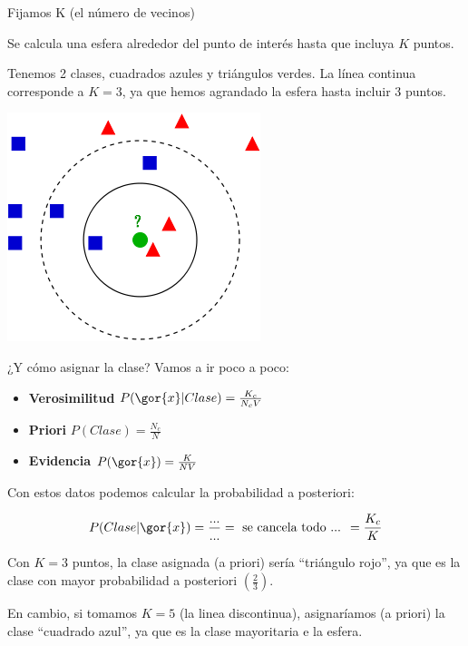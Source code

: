 \documentclass{apuntes}
\begin{document}
\begin{defn}
Fijamos K (el número de vecinos)

Se calcula una esfera alrededor del punto de interés hasta que incluya $K$ puntos.
\end{defn}

\begin{example}
Tenemos 2 clases, cuadrados azules y triángulos verdes. La línea continua corresponde a $K=3$, ya que hemos agrandado la esfera hasta incluir 3 puntos.

\begin{center}
\includegraphics[scale=0.7]{img/VecinosProximos.png}
\end{center}

¿Y cómo asignar la clase? Vamos a ir poco a poco:

\begin{itemize}
	\item \textbf{Verosimilitud} $P(\gor{x} | Clase) = \frac{K_c}{N_cV}$
	\item \textbf{Priori} $P(Clase) = \frac{N_c}{N}$
	\item \textbf{Evidencia} $P(\gor{x}) = \frac{K}{NV}$
\end{itemize}

Con estos datos podemos calcular la probabilidad a posteriori:

\[
P(Clase | \gor{x}) = \frac{...}{...} = \text{ se cancela todo ... } = \frac{K_c}{K}
\]

Con $K=3$ puntos, la clase asignada (a priori) sería ``triángulo rojo'', ya que es la clase con mayor probabilidad a posteriori $\left( \frac{2}{3} \right)$. 

En cambio, si tomamos $K=5$ (la linea discontinua), asignaríamos (a priori) la clase ``cuadrado azul'', ya que es la clase mayoritaria e la esfera.

\end{example}
\end{document}
